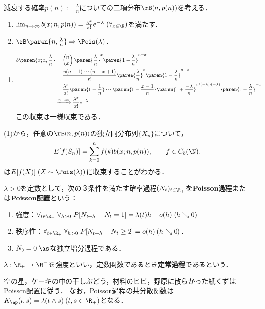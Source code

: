 \documentclass[uplatex,dvipdfmx]{jsreport}
\begin{document}
\begin{proposition}[二項分布の稀現象極限分布]
    減衰する確率$p(n):=\frac{\lambda}{n}$についての二項分布$\rB(n,p(n))$を考える．
    \begin{enumerate}
        \item $\lim_{n\to\infty}b(x;n,p(n))=\frac{\lambda^x}{x!}e^{-\lambda}\;(\forall_{x\in\N})$を満たす．
        \item $\rB\paren{n,\frac{\lambda}{n}}\Rightarrow\Pois(\lambda)$．
    \end{enumerate}
\end{proposition}
\begin{Proof}\mbox{}
    \begin{enumerate}
        \item \begin{align*}
            b\paren{x;n,\frac{\lambda}{n}}&=\begin{pmatrix}n\\x\end{pmatrix}\paren{\frac{\lambda}{n}}^x\paren{1-\frac{\lambda}{n}}^{n-x}\\
            &=\frac{n(n-1)\cdots (n-x+1)}{x!}\paren{\frac{\lambda}{n}}^x\paren{1-\frac{\lambda}{n}}^{n-x}\\
            &=\frac{\lambda^x}{x!}\paren{1-\frac{1}{n}}\cdots\paren{1-\frac{x-1}{n}}\paren{1+\frac{-\lambda}{n}}^{n/(-\lambda)\cdot(-\lambda)}\paren{1-\frac{\lambda}{n}}^{-x}\\
            &\xrightarrow{n\to\infty}\frac{\lambda^x}{x!}e^{-\lambda}
        \end{align*}
        この収束は一様収束である．
    \end{enumerate}
    \item (1)から，任意の$\rB(n,p(n))$の独立同分布列$\{X_n\}$について，
    \[E[f(S_n)]=\sum_{k=0}^nf(k)b(x;n,p(n)),\qquad f\in C_b(\N).\]
    は$E[f(X)]\;(X\sim\Pois(\lambda))$に収束することがわかる．
\end{Proof}

\begin{definition}
    $\lambda>0$を定数として，次の３条件を満たす確率過程$(N_t)_{t\in\R_+}$を\textbf{Poisson過程}または\textbf{Poisson配置}という：
    \begin{enumerate}
        \item 強度：$\forall_{t\in\R_+}\;\forall_{h>0}\;P[N_{t+h}-N_t=1]=\lambda(t) h+o(h)\;(h\searrow 0)$
        \item 秩序性：$\forall_{t\in\R_+}\;\forall_{h>0}\;P[N_{t+h}-N_t\ge2]=o(h)\;(h\searrow 0)$．
        \item $N_0=0\;\as$な独立増分過程である．
    \end{enumerate}
    $\lambda:\R_+\to\R^+$を強度といい，定数関数であるとき\textbf{定常過程}であるという．
\end{definition}
\begin{example}
    空の星，ケーキの中の干しぶどう，材料のヒビ，野原に散らかった紙くずはPoisson配置に従う．
    なお，Poisson過程の共分散関数は$K_\ep(t,s)=\lambda(t\land s)\;(t,s\in\R_+)$となる．
\end{example}
\end{document}
